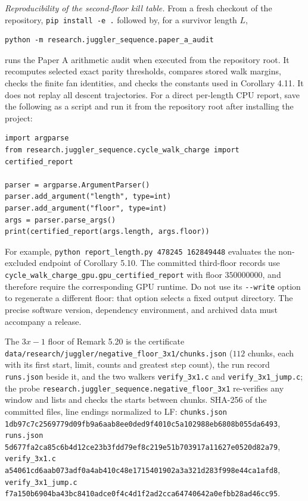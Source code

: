 \documentclass[12pt]{article}
\begin{document}
\emph{Reproducibility of the second-floor kill table.} From a fresh
checkout of the repository, \texttt{pip\ install\ -e\ .} followed by,
for a survivor length \(L\),

\begin{verbatim}
python -m research.juggler_sequence.paper_a_audit
\end{verbatim}

runs the Paper A arithmetic audit when executed from the repository
root. It recomputes selected exact parity thresholds, compares stored
walk margins, checks the finite fan identities, and checks the constants
used in Corollary 4.11. It does not replay all descent trajectories. For
a direct per-length CPU report, save the following as a script and run
it from the repository root after installing the project:

\begin{verbatim}
import argparse
from research.juggler_sequence.cycle_walk_charge import certified_report

parser = argparse.ArgumentParser()
parser.add_argument("length", type=int)
parser.add_argument("floor", type=int)
args = parser.parse_args()
print(certified_report(args.length, args.floor))
\end{verbatim}

For example, \texttt{python\ report\_length.py\ 478245\ 162849448}
evaluates the non-excluded endpoint of Corollary 5.10. The committed
third-floor records use
\texttt{\nolinkurl{cycle_walk_charge_gpu.gpu_certified_report}} with
floor \(350000000\), and therefore require the corresponding GPU
runtime. Do not use its \texttt{\nolinkurl{--write}} option to
regenerate a different floor: that option selects a fixed output
directory. The precise software version, dependency environment, and
archived data must accompany a release.

The \(3x-1\) floor of Remark 5.20 is the certificate
\texttt{\nolinkurl{data/research/juggler/negative_floor_3x1/chunks.json}}
(\(112\) chunks, each with its first start, limit, counts and greatest
step count), the run record \texttt{\nolinkurl{runs.json}} beside it,
and the two walkers \texttt{\nolinkurl{verify_3x1.c}} and
\texttt{\nolinkurl{verify_3x1_jump.c}}; the probe
\texttt{\nolinkurl{research.juggler_sequence.negative_floor_3x1}}
re-verifies any window and lists and checks the starts between chunks.
SHA-256 of the committed files, line endings normalized to LF:
\texttt{\nolinkurl{chunks.json}}
\texttt{\nolinkurl{1db97c7c2569779d09fb9a6aab8ee0ded9f4010c5a102988eb6808b055da6493}},
\texttt{\nolinkurl{runs.json}}
\texttt{\nolinkurl{5d677fa2ca85c6b4d12ce23b3fdd79ef8c219e51b703917a11627e0520d82a79}},
\texttt{\nolinkurl{verify_3x1.c}}
\texttt{\nolinkurl{a54061cd6aab073adf0a4ab410c48e1715401902a3a321d283f998e44ca1afd8}},
\texttt{\nolinkurl{verify_3x1_jump.c}}
\texttt{\nolinkurl{f7a150b6904ba43bc8410adce0f4c4d1f2ad2cca64740642a0efbb28ad46cc95}}.
\end{document}
